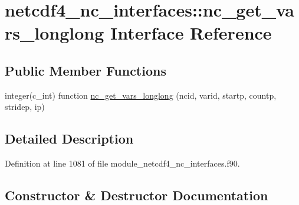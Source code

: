 \hypertarget{interfacenetcdf4__nc__interfaces_1_1nc__get__vars__longlong}{}\section{netcdf4\+\_\+nc\+\_\+interfaces\+:\+:nc\+\_\+get\+\_\+vars\+\_\+longlong Interface Reference}
\label{interfacenetcdf4__nc__interfaces_1_1nc__get__vars__longlong}
\subsection*{Public Member Functions}
\begin{DoxyCompactItemize}
\item 
integer(c\+\_\+int) function \hyperlink{interfacenetcdf4__nc__interfaces_1_1nc__get__vars__longlong_a9e8792c9be6a75bfd2fc69ca0d842672}{nc\+\_\+get\+\_\+vars\+\_\+longlong} (ncid, varid, startp, countp, stridep, ip)
\end{DoxyCompactItemize}


\subsection{Detailed Description}


Definition at line 1081 of file module\+\_\+netcdf4\+\_\+nc\+\_\+interfaces.\+f90.



\subsection{Constructor \& Destructor Documentation}
\mbox{\label{interfacenetcdf4__nc__interfaces_1_1nc__get__vars__longlong_a9e8792c9be6a75bfd2fc69ca0d842672}} 
